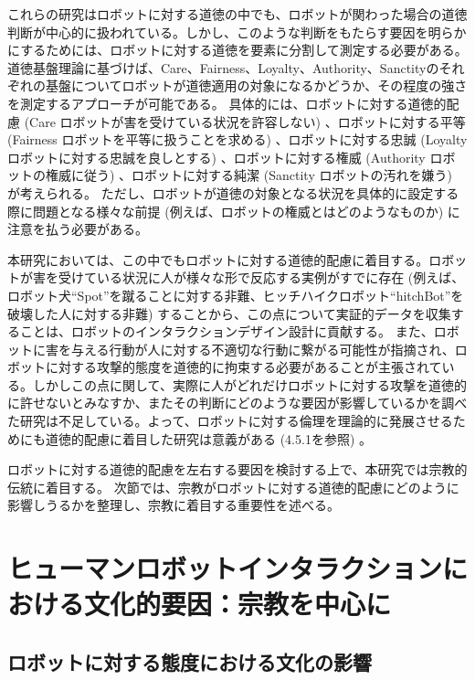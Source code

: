 \documentclass[a4j,12pt]{jreport}
\begin{document}
これらの研究はロボットに対する道徳の中でも、ロボットが関わった場合の道徳判断が中心的に扱われている。しかし、このような判断をもたらす要因を明らかにするためには、ロボットに対する道徳を要素に分割して測定する必要がある。道徳基盤理論に基づけば、Care、Fairness、Loyalty、Authority、Sanctityのそれぞれの基盤についてロボットが道徳適用の対象になるかどうか、その程度の強さを測定するアプローチが可能である。
具体的には、ロボットに対する道徳的配慮 (Care ロボットが害を受けている状況を許容しない) 、ロボットに対する平等 (Fairness ロボットを平等に扱うことを求める) 、ロボットに対する忠誠 (Loyalty ロボットに対する忠誠を良しとする) 、ロボットに対する権威 (Authority ロボットの権威に従う) 、ロボットに対する純潔 (Sanctity ロボットの汚れを嫌う) が考えられる。
ただし、ロボットが道徳の対象となる状況を具体的に設定する際に問題となる様々な前提 (例えば、ロボットの権威とはどのようなものか) に注意を払う必要がある。


本研究においては、この中でもロボットに対する道徳的配慮に着目する。ロボットが害を受けている状況に人が様々な形で反応する実例がすでに存在 (例えば、ロボット犬``Spot''を蹴ることに対する非難\cite{spot}、ヒッチハイクロボット``hitchBot''を破壊した人に対する非難\cite{hitch}) することから、この点について実証的データを収集することは、ロボットのインタラクションデザイン設計に貢献する。
また、ロボットに害を与える行動が人に対する不適切な行動に繋がる可能性が指摘され、ロボットに対する攻撃的態度を道徳的に拘束する必要があることが主張されている。しかしこの点に関して、実際に人がどれだけロボットに対する攻撃を道徳的に許せないとみなすか、またその判断にどのような要因が影響しているかを調べた研究は不足している。よって、ロボットに対する倫理を理論的に発展させるためにも道徳的配慮に着目した研究は意義がある (4.5.1を参照) 。



ロボットに対する道徳的配慮を左右する要因を検討する上で、本研究では宗教的伝統に着目する。
次節では、宗教がロボットに対する道徳的配慮にどのように影響しうるかを整理し、宗教に着目する重要性を述べる。





\newpage
\chapter{ヒューマンロボットインタラクションにおける文化的要因：宗教を中心に}
\section{ロボットに対する態度における文化の影響}
\end{document}
